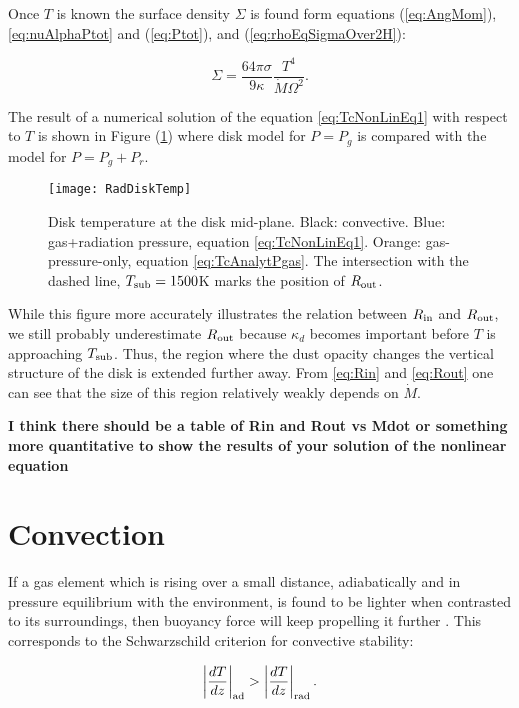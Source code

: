 \documentclass[12pt,english,preprint]{aastex}
\newcommand{\su}[2]{#1_{\rm #2}}
\newcommand{\Rout}{\su{R}{out}}
\newcommand{\Rin}{\su{R}{in}}
\newcommand{\Tc}{T}
\begin{document}
Once $\Tc$ is known the surface
density $\Sigma$ is found form equations 
(\ref{eq:AngMom}),\eqref{eq:nuAlphaPtot} and (\ref{eq:Ptot}),
and (\ref{eq:rhoEqSigmaOver2H}):


\begin{equation}
\Sigma=\frac{64\pi\sigma}{9 \kappa} 
\frac{\Tc^{4}}{\dot{M}\Omega^{2}}
\mbox{.}\label{eq:SigmaSolArbP}
\end{equation}

\noindent The result of a numerical solution of the equation 
\eqref{eq:TcNonLinEq1}
with respect to $\Tc$ is shown in 
Figure (\ref{fig:RadDiskTempPlot}) where 
disk model for $P=P_g$ is compared with the model for
$P=P_g+P_r$.


\begin{figure}
  \texttt{[image: RadDiskTemp]} 
  \caption{
  Disk temperature at the disk mid-plane.  
  Black: convective.  Blue: gas+radiation pressure, 
  equation \eqref{eq:TcNonLinEq1}.
  Orange: gas-pressure-only,
  equation \eqref{eq:TcAnalytPgas}. 
  The intersection with the dashed line, $T_{{\rm sub}}=1500$K marks the 
  position of $\Rout$.}
  \label{fig:RadDiskTempPlot} 
  \end{figure}
  

While this figure more accurately illustrates the relation between
$\Rin$ and $\Rout$, we still probably underestimate $\Rout$
because $\kappa_d$ becomes important before $T$ is approaching
$T_{{\rm sub}}$. Thus, the region where the dust opacity changes the
vertical structure of the disk is extended further away. From
\eqref{eq:Rin} and \eqref{eq:Rout} one can see that the size of this
region relatively weakly depends on $\dot{M}$.

{\bf I think there should be a table of Rin and Rout vs Mdot or something more quantitative to show the results of your solution of the nonlinear equation}

\section{Convection}

If a gas element which is rising over a small distance, adiabatically
and in pressure equilibrium with the environment, is found to 
be lighter when contrasted to its surroundings, then
buoyancy force will keep propelling it further \citep{KippenhahnWeigert94}.
This corresponds to the  Schwarzschild criterion for convective
stability:

\begin{equation}
\left|\frac{dT}{dz}\right|_{{\rm ad}}>\left|\frac{dT}{dz}\right|_{{\rm rad}}\mbox{.}\label{eq:SchwarzschildCrit}
\end{equation}
\end{document}
